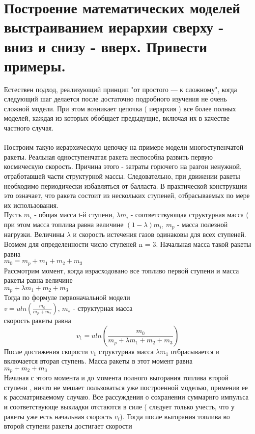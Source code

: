 \documentclass[12pt,a4paper]{article}
\begin{document}
	\section{Построение математических моделей выстраиванием иерархии сверху - вниз и снизу - вверх. Привести примеры.}
	Естествен подход, реализующий принцип "от простого — к сложному", когда следующий шаг делается после достаточно подробного изучения не очень сложной модели. При этом возникает цепочка ( иерархия ) все более полных моделей, каждая из которых обобщает предыдущие, включая их в качестве частного случая.\\\\	
	Построим такую иерархическую цепочку на примере модели многоступенчатой ракеты. Реальная одноступенчатая ракета неспособна развить первую космическую скорость. Причина этого - затраты горючего на разгон ненужной, отработавшей части структурной массы. Следовательно, при движении ракеты необходимо периодически избавляться от балласта. В практической конструкции это означает, что ракета состоит из нескольких ступеней, отбрасываемых по мере их использования.\\
	Пусть $m_i$ - общая масса i-й ступени, $\lambda m_i$ - соответствующая структурная масса ( при этом масса топлива равна величине $(1 - \lambda)m_i$, $m_p$ - масса полезной нагрузки. Величины $\lambda$ и скорость истечения газов одинаковы для всех ступеней. Возмем для определенности число ступеней n = 3. Начальная масса такой ракеты равна  \\
	$m_0 = m_p + m_1 + m_2 + m_3$\\
	Рассмотрим момент, когда израсходовано все топливо первой ступени и масса ракеты равна величине\\
	$m_p + \lambda m_1 + m_2 + m_3$\\
	Тогда по формуле первоначальной модели\\
	$v = u ln(\displaystyle\frac{m_0}{m_p + m_s}) $, $m_s$ - структурная масса\\
	скорость ракеты равна\\
	\begin{equation*}
	v_1 = u ln\left(\frac{m_0}{m_p + \lambda m_1 + m_2 + m_3}\right)
	\end{equation*}	
	После достижения скорости $v_1$ структурная масса $\lambda m_1 $ отбрасывается и включается вторая ступень. Масса ракеты в этот момент равна \\
	$m_p + m_2 + m_3$\\
	Начиная с этого момента и до момента полного выгорания топлива второй ступени , ничто не мешает пользоваться уже построенной моделью, применив ее к рассматриваемому случаю. Все рассуждения о сохранении суммарнго импульса и соответствующе выкладки отстаются в силе ( следует только учесть, что у ракеты уже есть начальная скорость  $v_i$). Тогда после выгорания топлива во второй ступени ракеты достигает скорости\\
\end{document}
